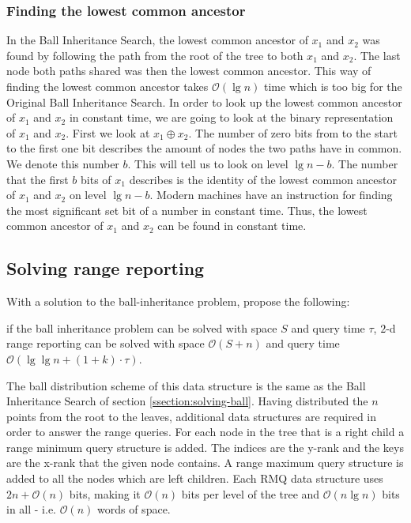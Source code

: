 \subsubsection{Finding the lowest common ancestor}
In the Ball Inheritance Search, the lowest common ancestor of $x_1$ and $x_2$ was found by following the path from the root of the tree to both $x_1$ and $x_2$. The last node both paths shared was then the lowest common ancestor. This way of finding the lowest common ancestor takes $\mathcal{O}(\lg n)$ time which is too big for the Original Ball Inheritance Search.
In order to look up the lowest common ancestor of $x_1$ and $x_2$ in constant time, we are going to look at the binary representation of $x_1$ and $x_2$. First we look at $x_1 \oplus x_2$. The number of zero bits from to the start to the first one bit describes the amount of nodes the two paths have in common. We denote this number $b$. This will tell us to look on level $\lg n - b$. The number that the first $b$ bits of $x_1$ describes is the identity of the lowest common ancestor of $x_1$ and $x_2$ on level $\lg n - b$. Modern machines have an instruction for finding the most significant set bit of a number in constant time. Thus, the lowest common ancestor of $x_1$ and $x_2$ can be found in constant time.


\subsection{Solving range reporting}

With a solution to the ball-inheritance problem, \citet{chanetal} propose the following: 
\begin{customlem}{2.4}\label{lemma24}
if the ball inheritance problem can be solved with space $S$ and query time $\tau$, $2$-d range reporting can be solved with space $\mathcal{O}(S+n)$ and query time $\mathcal{O}(\lg \lg n + (1+k)\cdot \tau)$.
\end{customlem}


The ball distribution scheme of this data structure is the same as the Ball Inheritance Search of section \ref{ssection:solving-ball}. Having distributed the $n$ points from the root to the leaves, additional data structures are required in order to answer the range queries. For each node in the tree that is a right child a range minimum query structure is added. The indices are the y-rank and the keys are the x-rank that the given node contains. A range maximum query structure is added to all the nodes which are left children. Each RMQ data structure uses $2n + \mathcal{O}(n)$ bits, making it $\mathcal{O}(n)$ bits per level of the tree and $\mathcal{O}(n \lg n)$ bits in all - i.e. $\mathcal{O}(n)$ words of space. \\

